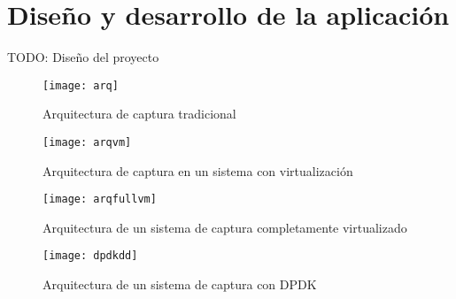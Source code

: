 \chapter{Diseño y desarrollo de la aplicación\label{sec:disenho}}

TODO: Diseño del proyecto




\begin{figure}[!th]
\centering
\texttt{[image: arq]}
\caption{Arquitectura de captura tradicional}
\label{fig:dis:arq}
\end{figure}


\begin{figure}[!th]
\centering
\texttt{[image: arqvm]}
\caption{Arquitectura de captura en un sistema con virtualización}
\label{fig:dis:arqvm}
\end{figure}


\begin{figure}[!th]
\centering
\texttt{[image: arqfullvm]}
\caption{Arquitectura de un sistema de captura completamente virtualizado}
\label{fig:dis:arqfullvm}
\end{figure}



\begin{figure}[!th]
\centering
\texttt{[image: dpdkdd]}
\caption{Arquitectura de un sistema de captura con DPDK}
\label{fig:dis:dpdkdd}
\end{figure}


